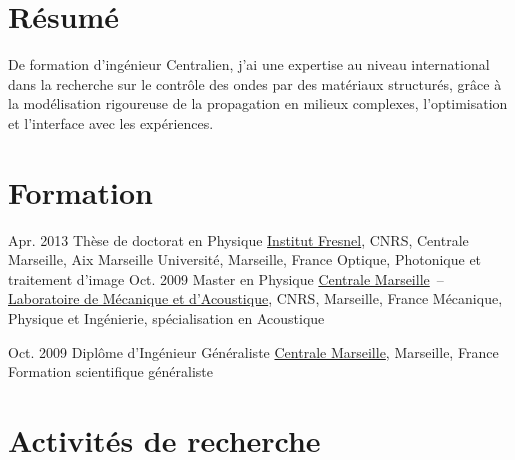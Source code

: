 \documentclass{cv}
\begin{document}



\section{Résumé}
De formation d'ingénieur Centralien, j'ai une expertise au niveau international dans la recherche sur le contrôle des ondes par des matériaux structurés, grâce à la modélisation rigoureuse de la propagation en milieux complexes, l'optimisation et l'interface avec les expériences.

\section{Formation}

\begin{entrylist}
	\entry
	{Apr. 2013}
	{Thèse de doctorat {\normalfont en Physique}}
	{\href{http://www.fresnel.fr/spip/}{Institut Fresnel}, CNRS, Centrale Marseille, Aix Marseille Universit\'e, Marseille, France}
	{Optique, Photonique et traitement d'image}
	\entry
	{Oct. 2009}
	{Master {\normalfont en Physique}}
	{\href{http://www.centrale-marseille.fr/}{Centrale Marseille}~--~
		\href{http://www.lma.cnrs-mrs.fr/}{Laboratoire de Mécanique et d'Acoustique}, CNRS, Marseille, France}
	{Mécanique, Physique et Ingénierie, spécialisation en Acoustique}

	\entry
	{Oct. 2009}
	{Diplôme d'{Ingénieur Généraliste}}
	{\href{http://www.centrale-marseille.fr/}{Centrale Marseille}, Marseille, France}
	{Formation scientifique généraliste}
\end{entrylist}


\vspace*{-0.2cm}
\section{Activités de recherche}
\end{document}
